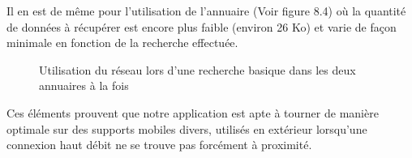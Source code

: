Il en est de même pour l’utilisation de l’annuaire (Voir figure 8.4) où la quantité de données à récupérer est encore plus faible (environ 26 Ko) et varie de façon minimale en fonction de la recherche effectuée. 

\begin{figure}[h!]
  \label{fig:network_statistics_directory}
  \center
  \setlength\fboxsep{5pt}
  \setlength\fboxrule{0.5pt}
  \caption{Utilisation du réseau lors d'une recherche basique dans les deux annuaires à la fois}
\end{figure}

Ces éléments prouvent que notre application est apte à tourner de manière optimale sur des supports mobiles divers, utilisés en extérieur lorsqu’une connexion haut débit ne se trouve pas forcément à proximité.